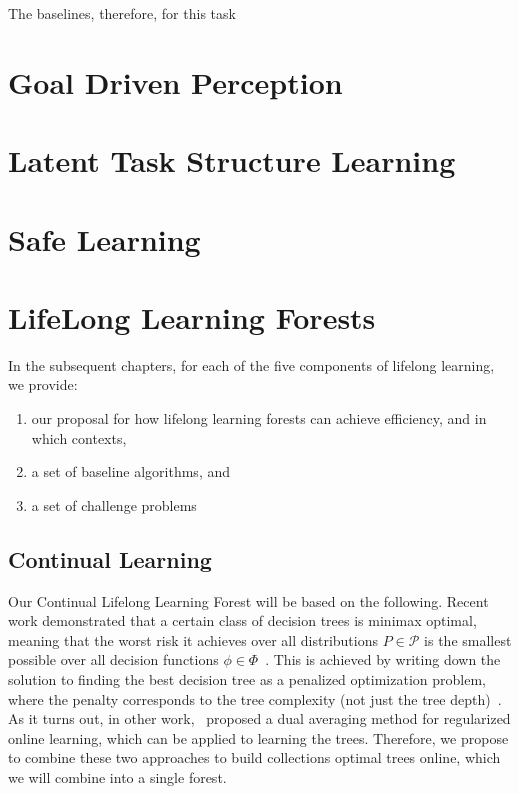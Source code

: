 \documentclass{article}
\begin{document}
The baselines, therefore, for this task 


\section{Goal Driven Perception}

\section{Latent Task Structure Learning}

\section{Safe Learning}


\appendix
\section{LifeLong Learning Forests}


In the subsequent chapters,  for each of the five components of lifelong learning, we provide:
\begin{enumerate}
    \item our proposal for how lifelong learning forests can achieve efficiency, and in which contexts,
    \item a set of baseline algorithms, and
    \item a set of challenge problems
\end{enumerate}

\subsection{Continual Learning}

Our Continual Lifelong Learning Forest will be based on the following.  Recent work demonstrated that a certain class of decision trees is minimax optimal, meaning that the worst risk it achieves over all distributions $P \in \mathcal{P}$ is the smallest possible over all decision functions $\phi \in \Phi$~\cite{Scott2006}.  This is achieved by writing down the solution to finding the best decision tree as a penalized optimization problem, where the penalty corresponds to the tree complexity (not just the tree depth)~\cite{Scott2005}. As it turns out, in other work,~\citet{Xiao2010} proposed a dual averaging method for regularized online learning, which can be applied to learning the trees. Therefore, we propose to combine these two approaches to build collections optimal trees online, which we will combine into a single forest. 
\end{document}
